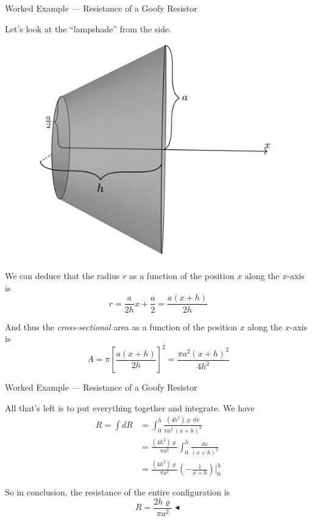 \documentclass{beamer}
\begin{document}
\begin{frame}{Worked Example --- Resistance of a Goofy Resistor}

Let's look at the ``lampshade'' from the side.

\begin{figure}[H]
\centering
\includegraphics[height=0.3\textheight]{figures/whatradius.png}
\end{figure}

We can deduce that the radius $r$ as a function of the position $x$ along the $x$-axis is
\begin{equation*}
    r = \frac{a}{2h} x + \frac{a}{2} = \frac{a \left(x + h\right)}{2h}
\end{equation*}

And thus the \emph{cross-sectional} area as a function of the position $x$ along the $x$-axis is
\begin{equation*}
    A = \pi \left[ \frac{a \left(x + h\right)}{2h} \right]^2 = \frac{\pi a^2 \left(x + h\right)^2}{4h^2}
\end{equation*}

\end{frame}

\begin{frame}{Worked Example --- Resistance of a Goofy Resistor}

All that's left is to put everything together and integrate. We have
\begin{align*}
    R = \int dR &= \int_{0}^{h} \frac{(4h^2) \varrho\ dx}{\pi a^2\ \left( x + h \right)^2} \\
                &= \frac{(4h^2) \varrho}{\pi a^2} \int_{0}^{h} \frac{dx}{\left(x + h\right)^2} \\
                &= \frac{(4h^2) \varrho}{\pi a^2} \left( -\frac{1}{x + h} \right) \bigg|_{0}^{h}
\end{align*}

So in conclusion, the resistance of the entire configuration is
\begin{equation*}
    \boxed{R = \frac{2 h \varrho}{\pi a^2}} \blacktriangleleft
\end{equation*}

\end{frame}
\end{document}
